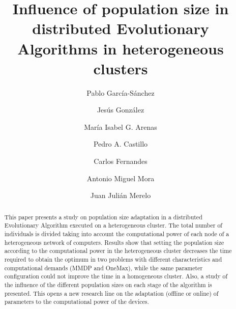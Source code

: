 \documentclass[final,1p,times]{elsarticle}
\begin{document}
\begin{frontmatter}



\title{Influence of population size in distributed Evolutionary Algorithms in heterogeneous clusters}


\author[ugr]{Pablo Garc\'ia-S\'anchez}
\author[ugr]{Jes\'us Gonz\'alez}
\author[ugr]{Mar\'ia Isabel G. Arenas}
\author[ugr]{Pedro A. Castillo}
\author[laseeb]{Carlos Fernandes}
\author[ugr]{Antonio Miguel Mora}
\author[ugr]{Juan Juli\'an Merelo}

\address[ugr]{Department of Computer Architecture and Computer Technology and CITIC-UGR, University of Granada, Granada, Spain. Tel: +34958241778. Fax: +34958248993}
\address[laseeb]{LaSEEB-ISR-IST, Technical University of Lisbon (IST), Lisbon, Portugal}%

\begin{abstract}
This paper presents a study on population size adaptation in a distributed Evolutionary Algorithm executed on a heterogeneous cluster. The total number of individuals is divided taking into account the computational power of each node of a heterogeneous network of computers. Results show that setting the population size according to the computational power in the heterogeneous cluster decreases the time required to obtain the optimum in two problems with different characteristics and computational demands (MMDP and OneMax), while the same parameter configuration could not improve the time in a homogeneous cluster. Also, a study of the influence of the different population sizes on each stage of the algorithm is presented. This opens a new research line on the adaptation (offline or online) of parameters to the computational power of the devices.


\end{abstract}
\end{frontmatter}
\end{document}
